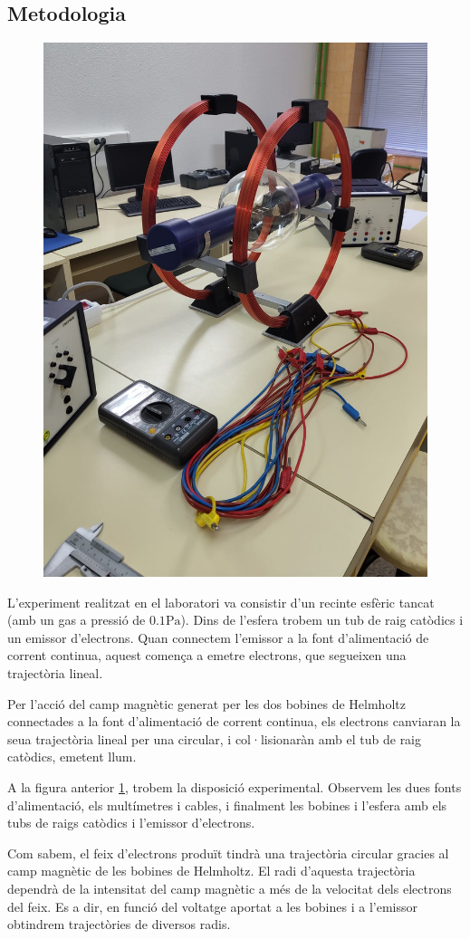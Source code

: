 \documentclass[11pt]{article}
\begin{document}
    \subsection{Metodologia} 
        \begin{figure}
            \label{fig:disposicio}
            \vspace{-0.9cm}
            \begin{center}
                \includegraphics[width=.2\textwidth]{fotos/disposicion.jpeg}
            \end{center}
        \end{figure}
        L’experiment realitzat en el laboratori va consistir d'un recinte esfèric tancat (amb un gas a pressió de $0.1\si{\pascal}$). Dins de l'esfera trobem un tub de raig catòdics i un emissor d'electrons. Quan connectem l'emissor a la font d'alimentació de corrent continua, aquest comença a emetre electrons, que segueixen una trajectòria lineal.
        
        \vspace{0.4cm}Per l'acció del camp magnètic generat per les dos bobines de Helmholtz connectades a la font d'alimentació de corrent continua, els electrons canviaran la seua trajectòria lineal per una circular, i col·lisionaràn amb el tub de raig catòdics, emetent llum.

        \vspace{0.4cm}A la figura anterior \ref{fig:disposicio}, trobem la disposició experimental. Observem les dues fonts d'alimentació, els multímetres i cables, i finalment les bobines i l'esfera amb els tubs de raigs catòdics i l'emissor d'electrons.

        \vspace{0.4cm}Com sabem, el feix d'electrons produït tindrà una trajectòria circular gracies al camp magnètic de les bobines de Helmholtz. El radi d'aquesta trajectòria dependrà de la intensitat del camp magnètic a més de la velocitat dels electrons del feix. Es a dir, en funció del voltatge aportat a les bobines i a l'emissor obtindrem trajectòries de diversos radis.
\end{document}
